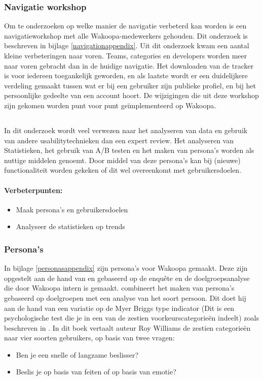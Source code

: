 \documentclass[a4paper, 10pt, pdftex]{report}
\begin{document}
    \subsubsection{Navigatie workshop}
      Om te onderzoeken op welke manier de navigatie verbeterd kan worden is een navigatieworkshop met alle Wakoopa-medewerkers gehouden. Dit onderzoek is beschreven in bijlage \ref{navigationappendix}. Uit dit onderzoek kwam een aantal kleine verbeteringen naar voren. Teams, categories en developers worden meer naar voren gebracht dan in de huidige navigatie. Het downloaden van de tracker is voor iedereen toegankelijk geworden, en als laatste wordt er een duidelijkere verdeling gemaakt tussen wat er bij een gebruiker zijn publieke profiel, en bij het persoonlijke gedeelte van een account hoort. De wijzigingen die uit deze workshop zijn gekomen worden punt voor punt ge\"implementeerd op Wakoopa.

    \subsection{\cite{Timmerman2008}}
    In dit onderzoek wordt veel verwezen naar het analyseren van data en gebruik van andere usabilitytechnieken dan een expert review. Het analyseren van Statistieken, het gebruik van A/B testen en het maken van persona's worden als nuttige middelen genoemt. Door middel van deze persona's kan bij (nieuwe) functionaliteit worden gekeken of dit wel overeenkomt met gebruikersdoelen.

    \paragraph{\textbf{Verbeterpunten:}}
      \begin{itemize}
        \item Maak persona's en gebruikersdoelen
        \item Analyseer de statistieken op trends
      \end{itemize}

    \subsubsection{Persona's}
      In bijlage \ref{personasappendix} zijn persona's voor Wakoopa gemaakt. Deze zijn opgestelt aan de hand van \cite{Klompsma} en gebaseerd op de enqu\^ete en de doelgroepsanalyse die door Wakoopa intern is gemaakt. \cite{Klompsma} combineert het maken van persona's gebaseerd op doelgroepen met een analyse van het soort persoon. Dit doet hij aan de hand van een variatie op de Myer Briggs type indicator (Dit is een psychologische test die je in een van de zestien voorkeurscategorie\"en indeelt) zoals beschreven in \cite{Williams}. In dit boek vertaalt auteur Roy Williams de zestien categorie\"en naar vier soorten gebruikers, op basis van twee vragen:
      \begin{itemize}
        \item Ben je een snelle of langzame beslisser?
        \item Beslis je op basis van feiten of op basis van emotie?
      \end{itemize}
\end{document}
